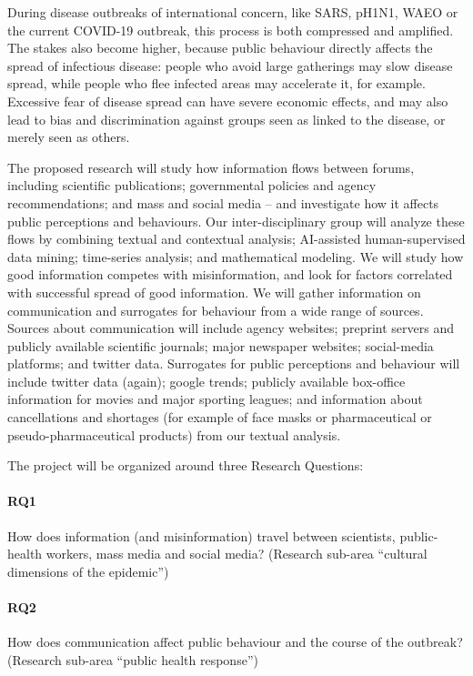 
\proptitle{\fulltitle}


During disease outbreaks of international concern, like SARS, pH1N1, WAEO  or the current COVID-19 outbreak, this process is both compressed and amplified. The stakes also become higher, because public behaviour directly affects the spread of infectious disease: people who avoid large gatherings may slow disease spread, while people who flee infected areas may accelerate it, for example. Excessive fear of disease spread can have severe economic effects, and may also lead to bias and discrimination against groups seen as linked to the disease, or merely seen as others.

The proposed research will study how information flows between forums, including scientific publications; governmental policies and agency recommendations; and mass and social media -- and investigate how it affects public perceptions and behaviours. 
Our inter-disciplinary group will analyze these flows by combining textual and contextual analysis; AI-assisted human-supervised data mining; time-series analysis; and mathematical modeling. We will study how good information competes with misinformation, and look for factors correlated with successful spread of good information. 
We will gather information on communication and surrogates for behaviour from a wide range of sources. 
Sources about communication will include agency websites; preprint servers and publicly available scientific journals; major newspaper websites; social-media platforms; and twitter data.
Surrogates for public perceptions and behaviour will include twitter data (again); google trends; publicly available box-office information for movies and major sporting leagues; and information about cancellations and shortages (for example of face masks or pharmaceutical or pseudo-pharmaceutical products) from our textual analysis. 

The project will be organized around three Research Questions:

\paragraph{RQ1} How does information (and misinformation) travel between scientists, public-health workers, mass media and social media? (Research sub-area ``cultural dimensions of the epidemic'')

\paragraph{RQ2} How does communication affect public behaviour and the course of the outbreak? (Research sub-area ``public health response'') 

